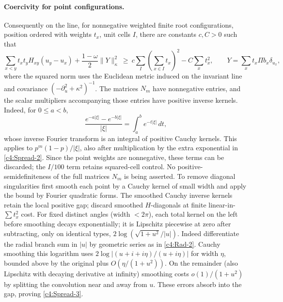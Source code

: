 \paragraph{Coercivity for point configurations.} Consequently on the line, for nonnegative weighted finite root configurations, position ordered with weights \(t_x\), unit cells \(I\), there are constants \(c,C>0\) such that
\begin{equation}
 \sum_{x<y}t_xt_y H_{xy}(u_y-u_x)
 +\frac{1-\omega}{2}\|Y\|_\kappa^2
 \ \ge\ c\sum_I(\sum_{x\in I}t_x)^2-C\sum_x t_x^2,\qquad Y=\sum_x t_x\Pi b_x\delta_{u_x},
                                                                            \label{c4:Spread-3}
\end{equation}
where the squared norm uses the Euclidean metric induced on the invariant line and covariance \((-\partial_u^2+\kappa^2)^{-1}\). The matrices \(N_m\) have nonnegative entries, and the scalar multipliers accompanying those entries have positive inverse kernels. Indeed, for \(0\le a<b\),
\[
 \frac{e^{-a|\xi|}-e^{-b|\xi|}}{|\xi|}
       =\int_a^b e^{-t|\xi|}\,dt,
\]
whose inverse Fourier transform is an integral of positive Cauchy kernels. This applies to \(p^m(1-p)/|\xi|\), also after multiplication by the extra exponential in \eqref{c4:Spread-2}. Since the point weights are nonnegative, these terms can be discarded; the \(I/100\) term retains squared-cell control. No positive-semidefiniteness of the full matrices \(N_m\) is being asserted. To remove diagonal singularities first smooth each point by a Cauchy kernel of small width and apply the bound by Fourier quadratic forms. The smoothed Cauchy inverse kernels retain the local positive gap; discard smoothed \(H\)-diagonals at finite linear-in-\(\sum t_x^2\) cost. For fixed distinct angles (width \(<2\pi\)), each total kernel on the left before smoothing decays exponentially; it is Lipschitz piecewise at zero after subtracting, only on identical types, \(2\log(\sqrt{1+u^2}/|u|)\). Indeed differentiate the radial branch sum in \(|u|\) by geometric series as in \eqref{c4:Rad-2}. Cauchy smoothing this logarithm uses \(2\log|(u+i+i\eta)/(u+i\eta)|\) for width \(\eta\), bounded above by the original plus \(O(\eta/(1+u^2))\). On the remainder (also Lipschitz with decaying derivative at infinity) smoothing costs \(o(1)/(1+u^2)\) by splitting the convolution near and away from \(u\). These errors absorb into the gap, proving \eqref{c4:Spread-3}.

